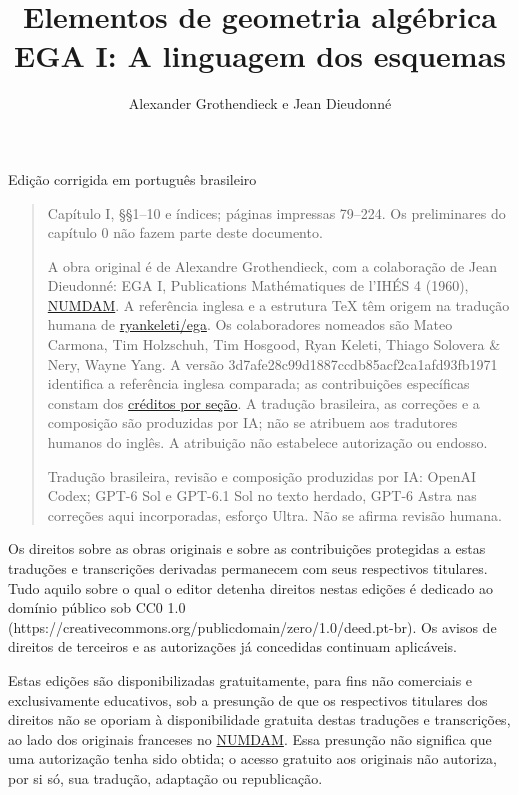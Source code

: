 \documentclass[oneside]{amsart}
\let\EGAOriginalLabel\label
\renewcommand{\label}[1]{\phantomsection\EGAOriginalLabel{#1}}
\begin{document}
\title{Elementos de geometria algébrica\\EGA I: A linguagem dos esquemas}
\author{Alexander Grothendieck e Jean Dieudonné}
\date{}
\maketitle
{}
\label{reader:ega1-ptBR}
\begin{center}
\large Edição corrigida em português brasileiro
\end{center}
\begin{quote}\small
Capítulo I, §§1–10 e índices; páginas impressas 79–224. Os preliminares do capítulo 0 não fazem parte deste documento.

A obra original é de Alexandre Grothendieck, com a colaboração de Jean Dieudonné: EGA I, Publications Mathématiques de l’IHÉS 4 (1960), \href{https://numdam.org/item/PMIHES\_1960\_\_4\_\_5\_0/}{NUMDAM}. A referência inglesa e a estrutura TeX têm origem na tradução humana de \href{https://github.com/ryankeleti/ega/tree/3d7afe28c99d1887ccdb85acf2ca1afd93fb1971}{ryankeleti/ega}. Os colaboradores nomeados são Mateo Carmona, Tim Holzschuh, Tim Hosgood, Ryan Keleti, Thiago Solovera \& Nery, Wayne Yang. A versão 3d7afe28c99d1887ccdb85acf2ca1afd93fb1971 identifica a referência inglesa comparada; as contribuições específicas constam dos \href{https://github.com/ryankeleti/ega/blob/3d7afe28c99d1887ccdb85acf2ca1afd93fb1971/README.md}{créditos por seção}. A tradução brasileira, as correções e a composição são produzidas por IA; não se atribuem aos tradutores humanos do inglês. A atribuição não estabelece autorização ou endosso.

Tradução brasileira, revisão e composição produzidas por IA: OpenAI Codex; GPT-6 Sol e GPT-6.1 Sol no texto herdado, GPT-6 Astra nas correções aqui incorporadas, esforço Ultra. Não se afirma revisão humana.
\end{quote}
\begingroup\small
Os direitos sobre as obras originais e sobre as contribuições protegidas a estas traduções e transcrições derivadas permanecem com seus respectivos titulares. Tudo aquilo sobre o qual o editor detenha direitos nestas edições é dedicado ao domínio público sob CC0 1.0 (https://creativecommons.org/publicdomain/zero/1.0/deed.pt-br). Os avisos de direitos de terceiros e as autorizações já concedidas continuam aplicáveis.

Estas edições são disponibilizadas gratuitamente, para fins não comerciais e exclusivamente educativos, sob a presunção de que os respectivos titulares dos direitos não se oporiam à disponibilidade gratuita destas traduções e transcrições, ao lado dos originais franceses no \href{https://www.numdam.org/}{NUMDAM}. Essa presunção não significa que uma autorização tenha sido obtida; o acesso gratuito aos originais não autoriza, por si só, sua tradução, adaptação ou republicação.
\end{document}
